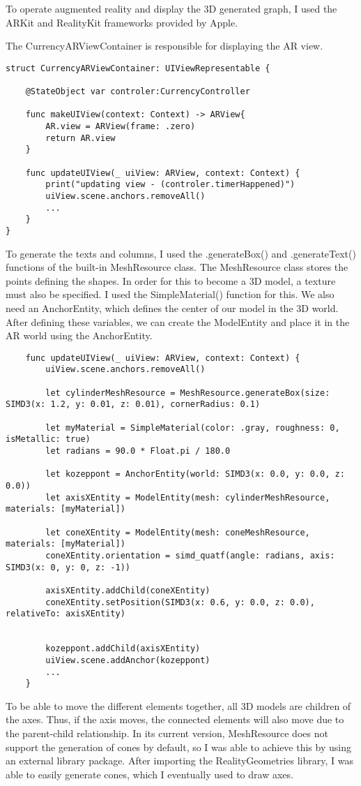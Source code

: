 To operate augmented reality and display the 3D generated graph, I used the ARKit and RealityKit frameworks provided by Apple.

The CurrencyARViewContainer is responsible for displaying the AR view.

\begin{lstlisting}
struct CurrencyARViewContainer: UIViewRepresentable {
    
    @StateObject var controler:CurrencyController
    
    func makeUIView(context: Context) -> ARView{
        AR.view = ARView(frame: .zero)
        return AR.view
    }
    
    func updateUIView(_ uiView: ARView, context: Context) {
        print("updating view - (controler.timerHappened)")
        uiView.scene.anchors.removeAll()
        ...
    }
}
\end{lstlisting}

To generate the texts and columns, I used the .generateBox() and .generateText() functions of the built-in MeshResource class.
The MeshResource class stores the points defining the shapes. In order for this to become a 3D model, a texture must also be specified. I used the SimpleMaterial() function for this.
We also need an AnchorEntity, which defines the center of our model in the 3D world.
After defining these variables, we can create the ModelEntity and place it in the AR world using the AnchorEntity.

\begin{lstlisting}
    func updateUIView(_ uiView: ARView, context: Context) {
        uiView.scene.anchors.removeAll()
        
        let cylinderMeshResource = MeshResource.generateBox(size: SIMD3(x: 1.2, y: 0.01, z: 0.01), cornerRadius: 0.1)
        
        let myMaterial = SimpleMaterial(color: .gray, roughness: 0, isMetallic: true)
        let radians = 90.0 * Float.pi / 180.0
            
        let kozeppont = AnchorEntity(world: SIMD3(x: 0.0, y: 0.0, z: 0.0))
        let axisXEntity = ModelEntity(mesh: cylinderMeshResource, materials: [myMaterial])
        
        let coneXEntity = ModelEntity(mesh: coneMeshResource, materials: [myMaterial])
        coneXEntity.orientation = simd_quatf(angle: radians, axis: SIMD3(x: 0, y: 0, z: -1))
        
        axisXEntity.addChild(coneXEntity)
        coneXEntity.setPosition(SIMD3(x: 0.6, y: 0.0, z: 0.0), relativeTo: axisXEntity)
        
        
        kozeppont.addChild(axisXEntity)
        uiView.scene.addAnchor(kozeppont)
        ...
    }
\end{lstlisting}

To be able to move the different elements together, all 3D models are children of the axes. Thus, if the axis moves, the connected elements will also move due to the parent-child relationship. In its current version, MeshResource does not support the generation of cones by default, so I was able to achieve this by using an external library package. After importing the RealityGeometries library, I was able to easily generate cones, which I eventually used to draw axes.
